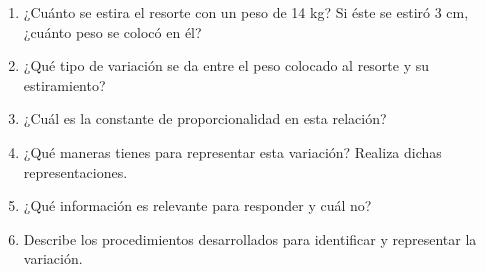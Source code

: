 \documentclass[11pt]{book}
\begin{document}
\begin{enumerate}
\begin{minipage}[t]{0.15\linewidth}
\begin{figure}[H]
            \label{fig:dinamometro}
          \end{figure}%
        \end{minipage}%
        \begin{minipage}[t]{0.85\linewidth}
          \begin{enumerate}
            \item ¿Cuánto se estira el resorte con un peso de 14 kg? Si éste se estiró 3 cm, ¿cuánto peso se colocó en él?
            \item ¿Qué tipo de variación se da entre el peso colocado al resorte y su estiramiento?
            \item ¿Cuál es la constante de proporcionalidad en esta relación?
            \item ¿Qué maneras tienes para representar esta variación? Realiza dichas representaciones.
            \item ¿Qué información es relevante para responder y cuál no?
            \item Describe los procedimientos desarrollados para identificar y representar la variación.
          \end{enumerate}

        \end{minipage}
        \newpage


\end{enumerate}
\end{document}
